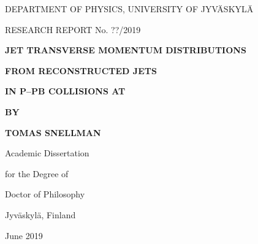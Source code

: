 



\thispagestyle{empty}
\vspace*{10mm}

\centerline{DEPARTMENT OF PHYSICS, UNIVERSITY OF JYV\"ASKYL\"A}
\centerline{RESEARCH REPORT No. ??/2019}

\vspace{25mm} 

\centerline{\bf JET TRANSVERSE MOMENTUM DISTRIBUTIONS }
\centerline{\bf  FROM RECONSTRUCTED JETS}

\centerline{\bf  IN P--PB COLLISIONS AT }
\centerline{\bf }
\vspace{13mm}


\centerline{\bf BY}
\centerline{\bf TOMAS SNELLMAN}

\vspace{13mm}

\centerline{Academic Dissertation}
\centerline{for the Degree of}
\centerline{Doctor of Philosophy}

\vspace{13mm}


\vspace{13mm}




\centerline{Jyv\"askyl\"a, Finland}
\centerline{June 2019}

\pagebreak
\thispagestyle{empty}

\vspace*{25mm} 


